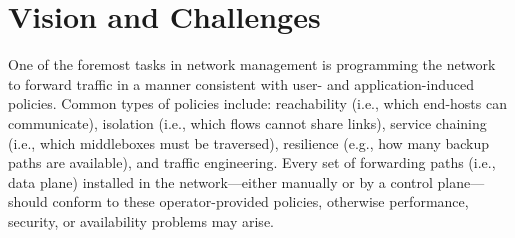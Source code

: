 \section{Vision and Challenges} \label{sec:vision}

One of the foremost tasks in network management is programming the network to
forward traffic in a manner consistent with user- and application-induced
policies. Common types of policies include: reachability (i.e., which
end-hosts can communicate), isolation (i.e., which flows cannot share links),
service chaining (i.e., which middleboxes must be traversed), resilience
(e.g., how many backup paths are available), and traffic engineering. Every
set of forwarding paths (i.e., data plane) installed in the network---either
manually or by a control plane---should conform to these operator-provided
policies, otherwise performance, security, or availability problems may arise.

